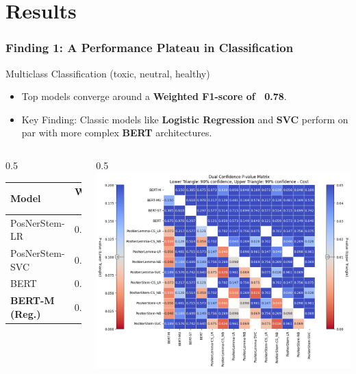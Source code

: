 \documentclass[aspectratio=169]{beamer}
\begin{document}
\section{Results}

\begin{frame}
  \frametitle{Finding 1: A Performance Plateau in Classification}
  
  \begin{block}{Multiclass Classification (toxic, neutral, healthy)}
    \begin{itemize}
      \item Top models converge around a \textbf{Weighted F1-score of ~0.78}.
      \item \alert{Key Finding:} Classic models like \textbf{Logistic Regression} and \textbf{SVC} perform on par with more complex \textbf{BERT} architectures.
    \end{itemize}
  \end{block}
  
  \begin{columns}[T]
    \begin{column}{0.5\textwidth}
      \small
      \begin{tabular}{lcc}
        \toprule
        \textbf{Model} & \textbf{Weighted F1} & \textbf{Cost} \\
        \midrule
        PosNerStem-LR & $0.76 \pm 0.02$ & $0.11 \pm 0.01$ \\
        PosNerStem-SVC & $0.77 \pm 0.03$ & $0.11 \pm 0.01$ \\
        BERT & $0.77 \pm 0.03$ & $0.10 \pm 0.02$ \\
        \textbf{BERT-M (Reg.)} & $\mathbf{0.78 \pm 0.04}$ & $\mathbf{0.10 \pm 0.02}$ \\
        \bottomrule
      \end{tabular}
    \end{column}
    \begin{column}{0.5\textwidth}
      \centering
      \includegraphics[width=\textwidth]{rsc/multiclass_statistical_tests2.png}
    \end{column}
  \end{columns}
  

\end{frame}
\end{document}
